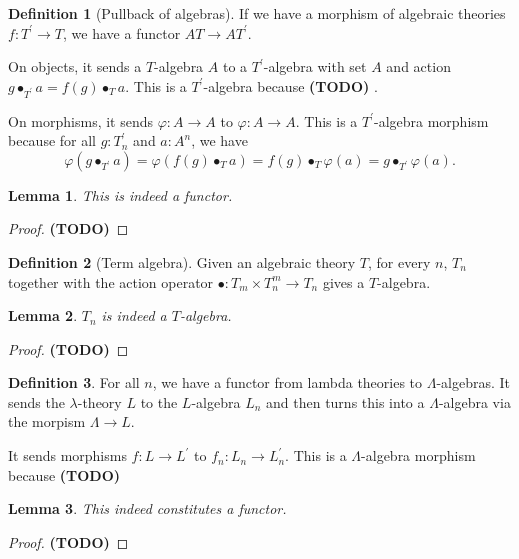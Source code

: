 \documentclass[a4paper]{amsbook}
\newtheorem{lemma}{Lemma}
\theoremstyle{definition}
\newtheorem{definition}{Definition}
\theoremstyle{remark}
\newcommand\TODO{\textbf{(TODO)} }
\begin{document}
  \begin{definition}[Pullback of algebras]
    If we have a morphism of algebraic theories $ f: T^\prime \to T $, we have a functor $ AT \to AT^\prime $.

    On objects, it sends a $ T $-algebra $ A $ to a $ T^\prime $-algebra with set $ A $ and action $ g \bullet_{T^\prime} a = f(g) \bullet_T a $. This is a $ T^\prime $-algebra because \TODO.

    On morphisms, it sends $ \varphi: A \to A $ to $ \varphi: A \to A $. This is a $ T^\prime $-algebra morphism because for all $ g: T^\prime_n $ and $ a: A^n $, we have
    \[ \varphi(g \bullet_{T^\prime} a) = \varphi(f(g) \bullet_T a) = f(g) \bullet_T \varphi(a) = g \bullet_{T^\prime} \varphi(a). \]
  \end{definition}
  \begin{lemma}
    This is indeed a functor.
  \end{lemma}
  \begin{proof}
    \TODO
  \end{proof}

  \begin{definition}[Term algebra]
    Given an algebraic theory $ T $, for every $ n $, $ T_n $ together with the action operator $ \bullet: T_m \times T_n^m \to T_n $ gives a $ T $-algebra.
  \end{definition}

  \begin{lemma}
    $ T_n $ is indeed a $ T $-algebra.
  \end{lemma}
  \begin{proof}
    \TODO
  \end{proof}

  \begin{definition}
    For all $ n $, we have a functor from lambda theories to $ \Lambda $-algebras. It sends the $ \lambda $-theory $ L $ to the $ L $-algebra $ L_n $ and then turns this into a $ \Lambda $-algebra via the morpism $ \Lambda \to L $.

    It sends morphisms $ f: L \to L^\prime $ to $ f_n : L_n \to L^\prime_n $. This is a $ \Lambda $-algebra morphism because \TODO
  \end{definition}

  \begin{lemma}
    This indeed constitutes a functor.
  \end{lemma}
  \begin{proof}
    \TODO
  \end{proof}
\end{document}
